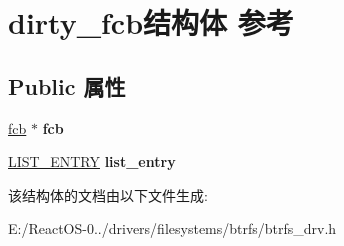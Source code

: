 \hypertarget{structdirty__fcb}{}\section{dirty\+\_\+fcb结构体 参考}
\label{structdirty__fcb}
\subsection*{Public 属性}
\begin{DoxyCompactItemize}
\item 
\mbox{\label{structdirty__fcb_a85d692e4a9b5573f2faad6c9b8fd9dd7}} 
\hyperlink{struct__fcb}{fcb} $\ast$ {\bfseries fcb}
\item 
\mbox{\label{structdirty__fcb_acdd0ecaedaf570d4b325f0f4c4322504}} 
\hyperlink{struct___l_i_s_t___e_n_t_r_y}{L\+I\+S\+T\+\_\+\+E\+N\+T\+RY} {\bfseries list\+\_\+entry}
\end{DoxyCompactItemize}


该结构体的文档由以下文件生成\+:\begin{DoxyCompactItemize}
\item 
E\+:/\+React\+O\+S-\/0../drivers/filesystems/btrfs/btrfs\+\_\+drv.\+h\end{DoxyCompactItemize}
